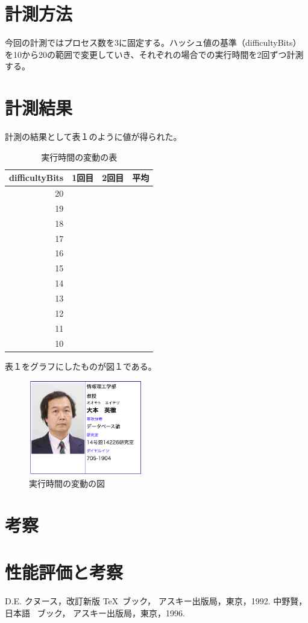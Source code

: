 \documentclass[uplatex, twocolumn,10pt]{jsarticle}
\begin{document}
\section{計測方法}
今回の計測ではプロセス数を3に固定する。ハッシュ値の基準（difficultyBits）を10から20の範囲で変更していき、それぞれの場合での実行時間を2回ずつ計測する。

\section{計測結果}
計測の結果として表１のように値が得られた。

\begin{table}[htb]
  \begin{center}
    \caption{実行時間の変動の表}
    \begin{tabular}{|r|r|r||r|} \hline
      difficultyBits & 1回目 & 2回目 & 平均 \\ \hline \hline
      20 &  &  &  \\
      19 &  &  &  \\
      18 &  &  &  \\
      17 &  &  &  \\
      16 &  &  &  \\
      15 &  &  &  \\
      14 &  &  &  \\
      13 &  &  &  \\
      12 &  &  &  \\
      11 &  &  &  \\
      10 &  &  &  \\ \hline
    \end{tabular}
  \end{center}
\end{table}

表１をグラフにしたものが図１である。

\begin{figure}
  \begin{center}
    \includegraphics[width=5cm]{sample.png}
    \caption{実行時間の変動の図}
  \end{center}
\end{figure}

\section{考察}

\section{性能評価と考察}

\begin{thebibliography}{99}
D.E. クヌース，改訂新版 \TeX\ ブック，
アスキー出版局，東京，1992.
中野賢，日本語 \LaTeXe\ ブック，
アスキー出版局，東京，1996.
\end{thebibliography}
\end{document}
